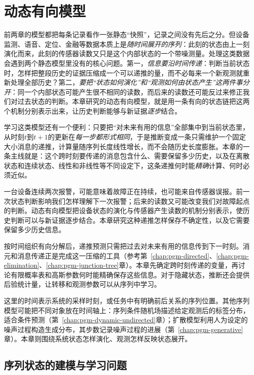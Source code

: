 \chapter{动态有向模型}
\label{chap:pgm-dynamic}

前两章的模型都把每条记录看作一张静态“快照”，记录之间没有先后之分。但设备监测、语音、定位、金融等数据本质上是\emph{随时间展开的序列}：此刻的状态由上一刻演化而来，此刻的传感器读数又只是这个内部状态的一个带噪测量。处理这类数据会遇到两个静态模型里没有的核心问题。第一，\emph{信息要沿时间传递}：判断当前状态时，怎样把整段历史的证据压缩成一个可以递推的量，而不必每来一个新观测就重新处理全部历史？第二，\emph{要把“状态如何演化”和“观测如何由状态产生”这两件事分开}：同一个内部状态可能产生很不相同的读数，而后来的读数还可能反过来修正我们对过去状态的判断。本章研究的动态有向模型，就是用一条有向的状态链把这两个机制分别表示出来，让历史判断能够与新证据\emph{逐步}结合。

学习这类模型还有一个便利：只要把“对未来有用的信息”全部集中到当前状态里，从时刻$t$到$t+1$的更新在\emph{每一步都形式相同}，于是推断变成一条只需维护一个固定大小消息的递推，计算量随序列长度线性增长，而不会随历史长度膨胀。本章的一条主线就是：这个跨时刻要传递的消息包含什么、需要保留多少历史，以及在离散状态和连续状态、线性和非线性等不同设定下，这条递推何时能\emph{精确}计算、何时必须近似。

一台设备连续两次报警，可能意味着故障正在持续，也可能来自传感器误报。前一次状态判断影响我们怎样理解下一次报警；后来的读数又可能改变我们对故障起点的判断。动态有向模型把设备状态的演化与传感器产生读数的机制分别表示，使历史判断可以与新证据逐步结合。本章研究这种递推怎样保存不确定性，以及它需要保留多少历史信息。

按时间组织有向分解后，递推预测只需把过去对未来有用的信息传到下一时刻。消元和消息传递正是完成这一压缩的工具（参考第~\ref{chap:pgm-directed}、\ref{chap:pgm-elimination}、\ref{chap:pgm-junction-tree}章）。本章先确定跨时刻传递的变量，再讨论有限概率表和高斯参数何时能精确保存这些信息。对于隐藏状态，推断还会提供后验统计量，让转移和观测参数可以从序列中学习。

这里的时间表示系统的采样时刻，或任务中有明确前后关系的序列位置。其他序列模型可能把不同对象放在时间轴上：序列条件随机场描述给定观测后的标签分布，适合条件预测（第~\ref{chap:pgm-dynamic-undirected}章）；扩散模型利用人为设定的噪声过程构造生成分布，其步数记录噪声过程的进展（第~\ref{chap:pgm-generative}章）。本章则围绕系统状态怎样演化、观测怎样反映状态展开。

\section{序列状态的建模与学习问题}
\label{sec:pgm-dynamic-common}

